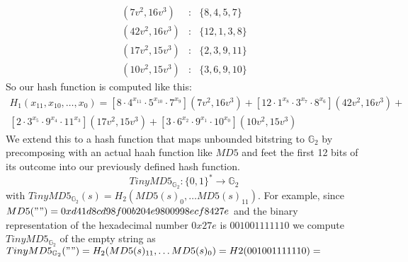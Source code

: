 $$
\begin{array}{lcl}
(7v^2 , 16v^3 ) &:& \{8,4,5,7\}\\
(42v^2 , 16v^3 ) &:& \{12,1,3,8\}\\
(17v^2 , 15v^3 ) &:& \{2,3,9,11\}\\
(10v^2 , 15v^3 ) &:& \{3,6,9,10\}
\end{array}
$$
So our hash function is computed like this:
\begin{multline*}
H_1(x_{11},x_{10},\ldots, x_{0})=
[8\cdot 4^{x_{11}}\cdot 5^{x_{10}}\cdot 7^{x_9}](7v^2 , 16v^3)+
[12\cdot 1^{x_8}\cdot 3^{x_7}\cdot 8^{x_6}](42v^2 , 16v^3 )+\\
[2\cdot 3^{x_5}\cdot 9^{x_4}\cdot 11^{x_3}](17v^2 , 15v^3 ) +
[3\cdot 6^{x_2}\cdot 9^{x_{1}}\cdot 10^{x_{0}}](10v^2 , 15v^3 )
\end{multline*}
We extend this to a hash function that maps unbounded bitstring to $\mathbb{G}_2$ by precomposing with an actual haah function like $MD5$ and feet the first 12 bits of its outcome into our previously defined hash function. 
$$
TinyMD5_{\mathbb{G}_2}: \{0,1\}^* \to \mathbb{G}_2
$$
with $TinyMD5_{\mathbb{G}_2}(s)= H_2(MD5(s)_0,\ldots MD5(s)_{11})$. For example, since 
$MD5("")=\\ 0xd41d8cd98f00b204e9800998ecf8427e$ and the binary representation of the hexadecimal number $0x27e$ is $001001111110$ we compute $TinyMD5_{\mathbb{G}_2}$ of the empty string as
$TinyMD5_{\mathbb{G}_2}("")= H_2(MD5(s)_{11},\ldots MD5(s)_{0}) = H2(001001111110)=$






